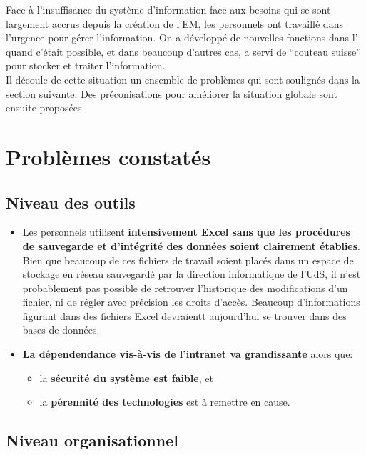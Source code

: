 \documentclass{book}
\begin{document}
Face à l'insuffisance du système d'information face aux  besoins qui se sont largement
accrus depuis la création de l'EM, les personnels ont travaillé dans l'urgence pour gérer 
l'information. On a développé de nouvelles fonctions dans l' quand c'était
possible, et dans beaucoup d'autres cas,  a servi de ``couteau suisse'' pour 
stocker et traiter l'information.\\

Il découle de cette situation un ensemble de problèmes qui sont soulignés dans la section
suivante. Des préconisations pour améliorer la situation globale sont ensuite proposées.

\section{Problèmes constatés}

\subsection{Niveau des outils}

\begin{itemize}
\item Les personnels utilisent \textbf{intensivement Excel sans que les procédures de 
sauvegarde et d'intégrité des données soient clairement établies}. Bien que beaucoup
de ces fichiers de travail soient placés dans un espace de stockage en réseau sauvegardé
par la direction informatique de l'UdS, il n'est probablement pas possible de retrouver
l'historique des modifications d'un fichier, ni de régler avec précision les droits d'accès.
Beaucoup d'informations figurant dans des fichiers Excel devraientt aujourd'hui se trouver dans
des bases de données.\\

\item \textbf{La dépendendance vis-à-vis de l'intranet va grandissante} alors que:
	\begin{itemize}
	\item la \textbf{sécurité du système est faible}, et
	\item la \textbf{pérennité des technologies} est à remettre en cause.
	\end{itemize}
\end{itemize}

\subsection{Niveau organisationnel}
\end{document}
